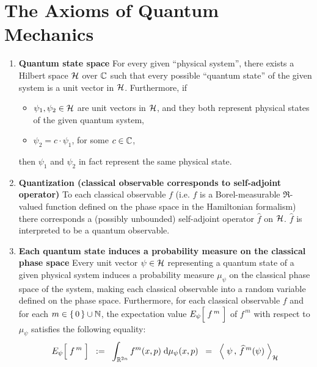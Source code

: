 

\section{The Axioms of Quantum Mechanics}
\setcounter{theorem}{0}
\setcounter{equation}{0}


\renewcommand{\theenumi}{\roman{enumi}}
\renewcommand{\labelenumi}{\textnormal{(\theenumi)}$\;\;$}


\begin{enumerate}
\item
	\textbf{Quantum state space}
	\vskip 0.05cm
	For every given ``physical system'', there exists a Hilbert space $\mathcal{H}$ over $\mathbb{C}$
	such that every possible ``quantum state'' of the given system is a unit vector in $\mathcal{H}$.
	Furthermore, if
	\begin{itemize}
	\item
		$\psi_{1}, \psi_{2} \in \mathcal{H}$ are unit vectors in $\mathcal{H}$, and they both represent physical states of the given quantum system,
	\item
		$\psi_{2} = c \cdot \psi_{1}$, for some $c \in \mathbb{C}$,
	\end{itemize}
	then $\psi_{1}$ and $\psi_{2}$ in fact represent the same physical state.

\vskip 0.5cm
\item
	\textbf{Quantization (classical observable corresponds to self-adjoint operator)}
	\vskip 0.05cm
	To each classical observable $f$
	(i.e. $f$ is a Borel-measurable $\Re$-valued function defined on the phase space in the Hamiltonian formalism)
	there corresponds a (possibly unbounded) self-adjoint operator
	$\widehat{f}$ on $\mathcal{H}$.
	$\widehat{f}$ is interpreted to be a quantum observable.

\vskip 0.5cm
\item
	\textbf{Each quantum state induces a probability measure on the classical phase space}
	\vskip 0.05cm
	Every unit vector $\psi \in \mathcal{H}$ representing a quantum state of a given physical system
	induces a probability measure $\mu_{\psi}$ on the classical phase space of the system,
	making each classical observable into a random variable defined on the phase space.
	Furthermore, for each classical observable $f$ and for each $m \in \{\,0\,\}\cup\mathbb{N}$,
	the expectation value $E_{\psi}\!\left[\;\overset{{\color{white}.}}{f^{\,m}}\;\right]$ of $f^{\,m}$
	with respect to $\mu_{\psi}$ satisfies the following equality:
	\begin{equation*}
	E_{\psi}\!\left[\;\overset{{\color{white}.}}{f^{\,m}}\;\right]
	\;\; := \;\;
		\int_{\Re^{2n}}
		f^{m}(x,p)
		\;\d\mu_{\psi}(x,p)
	\;\; = \;\;
		\left\langle\;
			\psi
			\,,\,
			\widehat{f}^{\,m}(\psi)
			\;\right\rangle_{\H}
	\end{equation*}


\end{enumerate}
